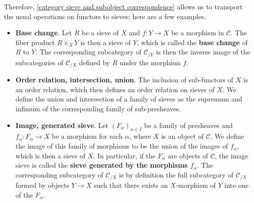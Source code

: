 Therefore, \cref{category sieve and subobject correspondence} allows us to transport the usual operations on functors to sieves; here are a few examples.
\begin{itemize}
\item \textbf{Base change}. Let $R$ be a sieve of $X$ and $f:Y\to X$ be a morphism in $\mathcal{C}$. The fiber product $R\times_XY$ is then a sieve of $Y$, which is called the \textbf{base change} of $R$ to $Y$. The corresponding subcategory of $\mathcal{C}_{/Y}$ is then the inverse image of the subcategories of $\mathcal{C}_{/X}$ defined by $R$ under the morphism $f$.
\item \textbf{Order relation, intersection, union}. The inclusion of sub-functors of $X$ is an order relation, which then defines an order relation on sieves of $X$. We define the union and intersection of a family of sieves as the supremum and infimum of the corresponding family of sub-presheaves.
\item \textbf{Image, generated sieve}. Let $(F_\alpha)_{\alpha\in I}$ be a family of presheaves and $f_\alpha:F_\alpha\to X$ be a morphism for each $\alpha$, where $X$ is an object of $\mathcal{C}$. We define the image of this family of morphisms to be the union of the images of $f_\alpha$, which is then a sieve of $X$. In particular, if the $F_\alpha$ are objects of $\mathcal{C}$, the image sieve is called the \textbf{sieve generated by the morphisms $f_\alpha$}. The corresponding subcategory of $\mathcal{C}_{/X}$ is by definition the full subcategory of $\mathcal{C}_{/X}$ formed by objects $Y\to X$ such that there exists an $X$-morphism of $Y$ into one of the $F_\alpha$.
\end{itemize}


